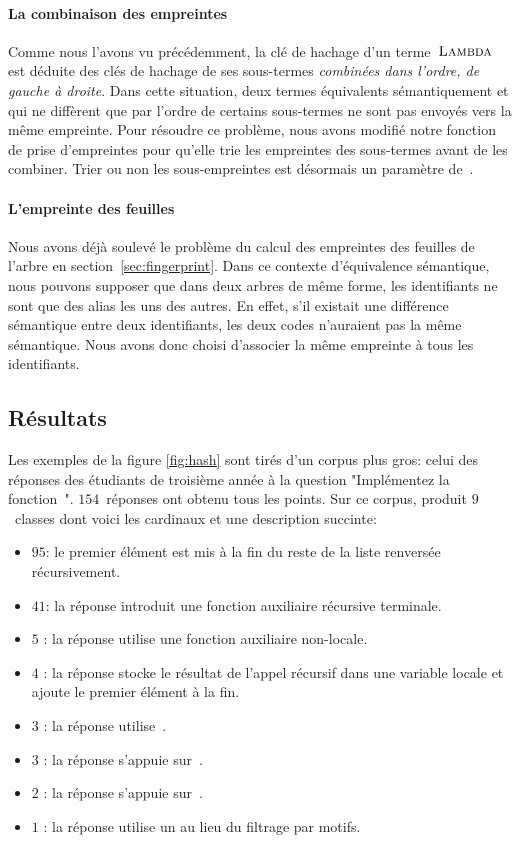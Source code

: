 \paragraph{La combinaison des empreintes}
Comme nous l'avons vu précédemment, la clé de hachage d'un
terme~$\textsc{Lambda}$ est déduite des clés de hachage de ses sous-termes
\textit{combinées dans l'ordre, de gauche à droite}. Dans cette
situation, deux termes équivalents sémantiquement et qui ne diffèrent
que par l'ordre de certains sous-termes ne sont pas envoyés vers la
même empreinte. Pour résoudre ce problème, nous avons modifié notre
fonction de prise d'empreintes pour qu'elle trie les empreintes des
sous-termes avant de les combiner. Trier ou non les sous-empreintes
est désormais un paramètre de~{\Asak}.

\paragraph{L'empreinte des feuilles}
Nous avons déjà soulevé le problème du calcul des empreintes des
feuilles de l'arbre en section~\ref{sec:fingerprint}. Dans ce contexte
d'équivalence sémantique, nous pouvons supposer que dans deux arbres
de même forme, les identifiants ne sont que des alias les uns des
autres. En effet, s'il existait une différence sémantique entre deux
identifiants, les deux codes n'auraient pas la même sémantique.  Nous
avons donc choisi d'associer la même empreinte à tous les
identifiants.  

\subsection{Résultats}

Les exemples de la figure \ref{fig:hash} sont tirés d'un corpus plus
gros: celui des réponses des étudiants de troisième année à la
question "Implémentez la fonction~". $154$~réponses ont
obtenu tous les points. Sur ce corpus, {\Asak} produit $9$~classes
dont voici les cardinaux et une description succinte:

\begin{itemize}
\item $95$: le premier élément est mis à la fin du reste de la liste renversée récursivement.
\item $41$: la réponse introduit une fonction auxiliaire récursive terminale.
\item $5$ : la réponse utilise une fonction auxiliaire non-locale.
\item $4$ : la réponse stocke le résultat de l'appel récursif dans une variable locale et ajoute le premier élément à la fin.
\item $3$ : la réponse utilise~.
\item $3$ : la réponse s'appuie sur~.
\item $2$ : la réponse s'appuie sur~.
\item $1$ : la réponse utilise un  au lieu du filtrage par motifs.
\end{itemize}

